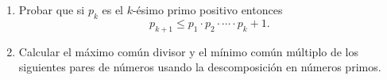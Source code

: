 \documentclass[a4paper,12pt,twoside,spanish,reqno]{amsbook}
\numberwithin{equation}{section}
\begin{document}
\begin{enumerate}
\item Probar que si $p_k$ es el $k$-ésimo primo positivo entonces 
    \begin{equation*}
        p_{k+1}\leq p_1\cdot p_2\cdot \cdots \cdot p_k+1.
    \end{equation*}



\item Calcular el máximo común divisor y el mínimo común múltiplo de los siguientes pares de números usando la descomposición en números primos. 


\end{enumerate}
\end{document}
